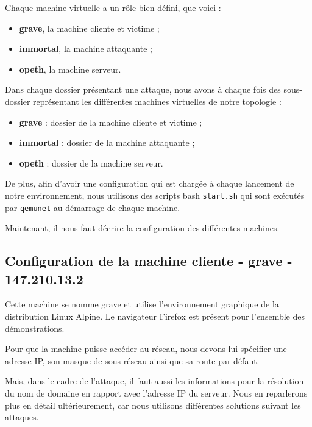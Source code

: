 \inputminted[bgcolor=lbcolor, breaklines]{shell}{../sslstrip2/topology}

Chaque machine virtuelle a un rôle bien défini, que voici :

\begin{itemize}
\item \textbf{grave}, la machine cliente et victime ;
\item \textbf{immortal}, la machine attaquante ;
\item \textbf{opeth}, la machine serveur.
\end{itemize}

Dans chaque dossier présentant une attaque, nous avons à chaque fois des sous-dossier représentant les différentes machines virtuelles de notre topologie :

\begin{itemize}
\item \textbf{grave} : dossier de la machine cliente et victime ;
\item \textbf{immortal} : dossier de la machine attaquante ;
\item \textbf{opeth} : dossier de la machine serveur.
\end{itemize}

De plus, afin d'avoir une configuration qui est chargée à chaque lancement de notre environnement, nous utilisons des scripts bash \verb+start.sh+ qui sont exécutés par \verb+qemunet+ au démarrage de chaque machine.

Maintenant, il nous faut décrire la configuration des différentes machines.

\subsection{Configuration de la machine cliente - grave - 147.210.13.2}

Cette machine se nomme grave et utilise l'environnement graphique de la distribution Linux Alpine. Le navigateur Firefox est présent pour l'ensemble des démonstrations.

Pour que la machine puisse accéder au réseau, nous devons lui spécifier une adresse IP, son masque de sous-réseau ainsi que sa route par défaut.

Mais, dans le cadre de l'attaque, il faut aussi les informations pour la résolution du nom de domaine en rapport avec l'adresse IP du serveur. Nous en reparlerons plus en détail ultérieurement, car nous utilisons différentes solutions suivant les attaques.

